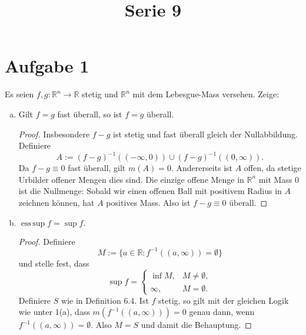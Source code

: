 \documentclass[10pt]{article}\usepackage[]{graphicx}\usepackage[]{color}
\title{Serie 9}
\date{}
\author{}
\newcommand{\R}{\mathbb{R}}
\DeclareMathOperator*{\esssup}{ess\,sup}
\begin{document}
\maketitle

\section*{Aufgabe 1}
Es seien $f, g: \R^n \to \R$ stetig und $\R^n$ mit dem Lebesgue-Mass
versehen. Zeige:
\begin{enumerate}[(a)]
  \item Gilt $f = g$ fast überall, so ist $f = g$ überall.
        
        \begin{proof}
        Insbesondere $f - g$ ist stetig und fast überall gleich
        der Nullabbildung. Definiere
        \[
          A := (f-g)^{-1}((-\infty, 0)) \cup (f-g)^{-1}((0, \infty)).
        \]
        Da $f - g \equiv 0$ fast überall, gilt $m(A) = 0$.
        Andererseits ist $A$ offen, da stetige Urbilder offener Mengen
        dies sind. Die einzige offene Menge in $\R^n$ mit Mass 0
        ist die Nullmenge: Sobald wir einen offenen Ball mit
        positivem Radius in $A$ zeichnen können, hat $A$ positives Mass.
        Also ist $f-g \equiv 0$ überall.
        \end{proof}
        
  \item $\esssup f = \sup f.$
        
        \begin{proof}
          Definiere
          \[
            M := \{a \in \R : f^{-1}((a, \infty)) = \emptyset \}
          \]
          und stelle fest, dass
          \[
            \sup f = 
            \begin{cases}
              \inf M, & M \neq \emptyset,\\
              \infty, & M = \emptyset.
            \end{cases}
          \]
          Definiere $S$ wie in Definition 6.4.
          Ist $f$ stetig, so gilt mit der gleichen Logik wie 
          unter 1(a), dass $m(f^{-1}((a, \infty))) = 0$
          genau dann, wenn $f^{-1}((a, \infty)) = \emptyset$.
          Also $M = S$ und damit die Behauptung.
        \end{proof}
\end{enumerate}
\end{document}
